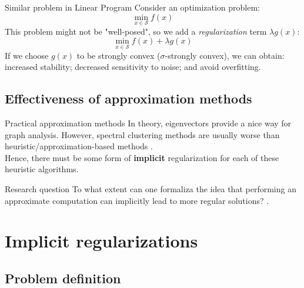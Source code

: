 \documentclass[handout]{beamer}
\begin{document}
    \begin{frame}{Similar problem in Linear Program}
        Consider an optimization problem:
        $$ \min_{x \in \mathcal{S}} f(x) $$
        \pause
        This problem might not be "well-posed", so we add a \textit{regularization} term $\lambda g(x)$:
        $$ \min_{x \in \mathcal{S}} f(x) + \lambda g(x) $$
        \pause
        If we choose $g(x)$ to be strongly convex ($\sigma$-strongly convex), we can obtain: increased stability; \pause decreased sensitivity to noise; \pause and avoid overfitting.
    \end{frame}

    \subsection{Effectiveness of approximation methods}
    \begin{frame}{Practical approximation methods}
    In theory, eigenvectors provide a nice way for graph analysis. \pause However, spectral clustering methods are usually worse than heuristic/approximation-based methods \cite{perozzi2014deepwalk,leskovec2008statistical}.\linebreak
    \\
    \pause
    \noindent
    Hence, there must be some form of \textbf{implicit} regularization for each of these heuristic algorithms.
        \begin{block}{Research question}
            To what extent can one formaliza the idea that performing an approximate computation can implicitly lead to more regular solutions? \cite{mahoney2010implementing}. \vspace{0.5em}
        \end{block}
    \end{frame}

    \section{Implicit regularizations}

    \subsection{Problem definition}
\end{document}
